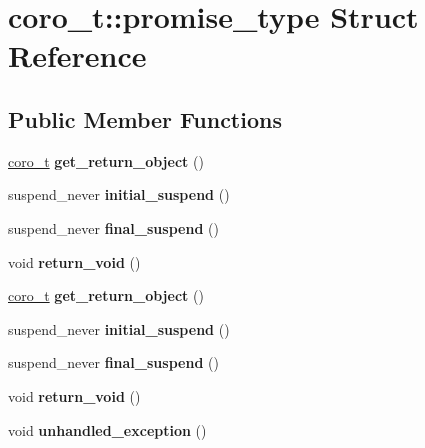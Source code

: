 \hypertarget{structcoro__t_1_1promise__type}{}\section{coro\+\_\+t\+:\+:promise\+\_\+type Struct Reference}
\label{structcoro__t_1_1promise__type}
\subsection*{Public Member Functions}
\begin{DoxyCompactItemize}
\item 
\mbox{\label{structcoro__t_1_1promise__type_ac162ea73387876956419f3c39e5293ed}} 
\mbox{\hyperlink{structcoro__t}{coro\+\_\+t}} {\bfseries get\+\_\+return\+\_\+object} ()
\item 
\mbox{\label{structcoro__t_1_1promise__type_a4cdbbab809bf536c389c6143ad60be03}} 
suspend\+\_\+never {\bfseries initial\+\_\+suspend} ()
\item 
\mbox{\label{structcoro__t_1_1promise__type_aed083712277876853be76fa7cb704d5f}} 
suspend\+\_\+never {\bfseries final\+\_\+suspend} ()
\item 
\mbox{\label{structcoro__t_1_1promise__type_a95e648f5d7bbdd06dcfa0b7a22f8562b}} 
void {\bfseries return\+\_\+void} ()
\item 
\mbox{\label{structcoro__t_1_1promise__type_ac162ea73387876956419f3c39e5293ed}} 
\mbox{\hyperlink{structcoro__t}{coro\+\_\+t}} {\bfseries get\+\_\+return\+\_\+object} ()
\item 
\mbox{\label{structcoro__t_1_1promise__type_a4cdbbab809bf536c389c6143ad60be03}} 
suspend\+\_\+never {\bfseries initial\+\_\+suspend} ()
\item 
\mbox{\label{structcoro__t_1_1promise__type_aed083712277876853be76fa7cb704d5f}} 
suspend\+\_\+never {\bfseries final\+\_\+suspend} ()
\item 
\mbox{\label{structcoro__t_1_1promise__type_a95e648f5d7bbdd06dcfa0b7a22f8562b}} 
void {\bfseries return\+\_\+void} ()
\item 
\mbox{\label{structcoro__t_1_1promise__type_a60ea31234034dd9565f1a78af8176751}} 
void {\bfseries unhandled\+\_\+exception} ()
\end{DoxyCompactItemize}
